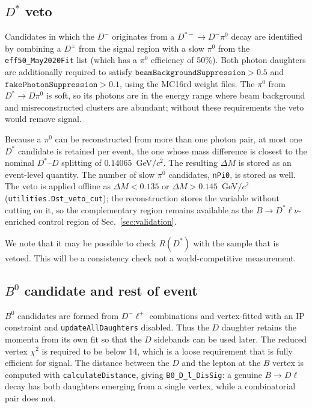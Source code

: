\subsection{$D^{*}$ veto}
\label{sec:recon:dstveto}

Candidates in which the $D^{-}$ originates from a $D^{*-} \to D^{-} \pi^{0}$
decay are identified by combining a $D^{\pm}$ from the signal region with
a slow $\pi^{0}$ from the \texttt{eff50\_May2020Fit} list
(which has a $\pi^0$ efficiency of 50\%).
Both photon daughters are additionally required to satisfy
$\texttt{beamBackgroundSuppression} > 0.5$ and
$\texttt{fakePhotonSuppression} > 0.1$, using the MC16rd weight files.
The $\pi^{0}$ from $D^{*} \to D \pi^{0}$ is soft, so its photons are in the
energy range where beam background and misreconstructed clusters are 
abundant; without these requirements the veto would remove signal.

Because a $\pi^{0}$ can be reconstructed from more than one photon pair, at most one
$D^{*}$ candidate is retained per event, the one whose mass difference is
closest to the nominal $D^{*}$--$D$ splitting of $0.14065$~GeV$/c^{2}$.
The resulting $\Delta M$ is stored as an event-level quantity.
The number of slow $\pi^{0}$ candidates, \texttt{nPi0}, is stored as well.
The veto is applied offline as
$\Delta M < 0.135$ or $\Delta M > 0.145$~GeV$/c^{2}$
(\texttt{utilities.Dst\_veto\_cut}); the reconstruction stores the variable
without cutting on it, so the complementary region remains available as the
$B \to D^{*} \ell \nu$-enriched control region of Sec.~\ref{sec:validation}.

We note that it may be possible to check $R(D^*)$ with the sample that is vetoed.
This will be a consistency check not a world-competitive measurement.

\subsection{$B^{0}$ candidate and rest of event}
\label{sec:recon:b}

$B^{0}$ candidates are formed
from $D^- \ell^+$ combinations and vertex-fitted with an IP
constraint and \texttt{updateAllDaughters} disabled.  Thus the $D$ daughter
retains the momenta from its own fit so that the $D$ sidebands can be used later.
The reduced vertex $\chi^{2}$ is required to be below 14, which is a loose requirement that is fully efficient for signal.
The distance between the $D$ and the lepton at the $B$ vertex is computed with
\texttt{calculateDistance}, giving \texttt{B0\_D\_l\_DisSig}: a genuine
$B \to D \ell$ decay has both daughters emerging from a single vertex, while a
combinatorial pair does not.


